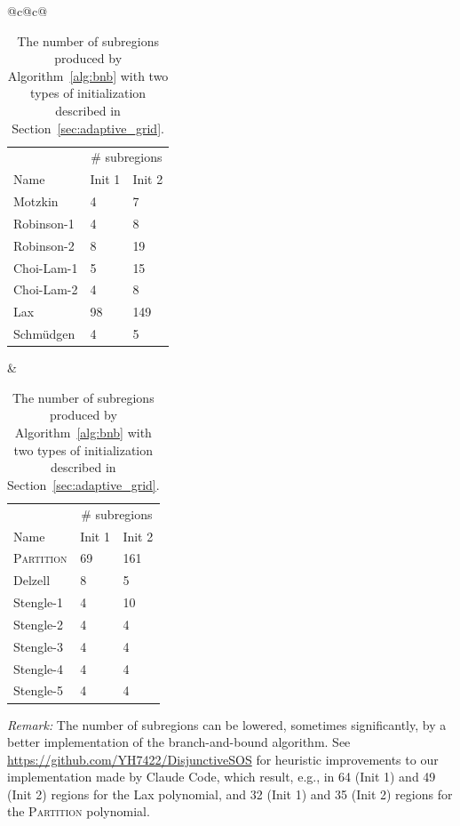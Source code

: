 \documentclass[12pt]{article}
\theoremstyle{remark}
\begin{document}
\begin{table}
  \centering
  \caption{The number of subregions produced by Algorithm~\ref{alg:bnb} with two types of initialization described in Section~\ref{sec:adaptive_grid}.}
  \label{tab:num_poly}
  \small
  \begin{tabular}{@{}c@{\hspace{1.5em}}c@{}}
  \begin{minipage}[t]{0.45\textwidth}
    \centering
    \begin{tabular}{lll}
      \toprule
      & \multicolumn{2}{c}{\# subregions} \\
      \multirow{-2}{*}{Name} & Init 1 & Init 2 \\\midrule
      Motzkin    & 4   & 7   \\
      Robinson-1 & 4   & 8   \\
      Robinson-2 & 8   & 19  \\
      Choi-Lam-1 & 5   & 15  \\
      Choi-Lam-2 & 4   & 8   \\
      Lax        & 98 & 149 \\
      Schm\"udgen & 4 & 5 \\\bottomrule
    \end{tabular}
  \end{minipage}
  &
  \begin{minipage}[t]{0.45\textwidth}
    \centering
    \begin{tabular}{lll}
      \toprule
      & \multicolumn{2}{c}{\# subregions} \\
      \multirow{-2}{*}{Name} & Init 1 & Init 2 \\\midrule
          \textsc{Partition} & 69 & 161 \\
        Delzell & 8 & 5 \\
      Stengle-1   & 4 & 10 \\
      Stengle-2   & 4 & 4 \\
      Stengle-3   & 4 & 4 \\
      Stengle-4   & 4 & 4 \\
      Stengle-5   & 4 & 4 \\
       \bottomrule
    \end{tabular}
  \end{minipage}
  \end{tabular}

    \vspace{.5em}
  \begin{minipage}{0.9\textwidth}
    \small \textit{Remark:} The number of subregions can be lowered, sometimes significantly, by a better implementation of the branch-and-bound algorithm. See \url{https://github.com/YH7422/DisjunctiveSOS} for heuristic improvements to our implementation made by Claude Code, which result, e.g., in 64 (Init 1) and 49 (Init 2) regions for the Lax polynomial, and 32 (Init 1) and 35 (Init 2) regions for the \textsc{Partition} polynomial.      
  \end{minipage}
\end{table}
\end{document}
